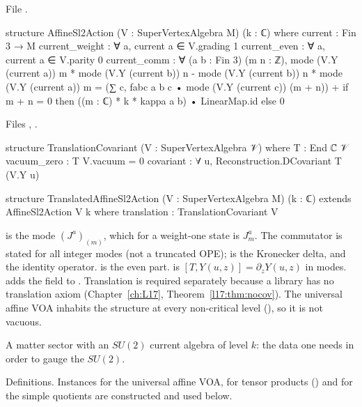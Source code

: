 \noindent File .
\begin{leancode}
structure AffineSl2Action (V : SuperVertexAlgebra M) (k : ℂ) where
  current : Fin 3 → M
  current_weight : ∀ a, current a ∈ V.grading 1
  current_even : ∀ a, current a ∈ V.parity 0
  current_comm : ∀ (a b : Fin 3) (m n : ℤ),
    mode (V.Y (current a)) m * mode (V.Y (current b)) n
      - mode (V.Y (current b)) n * mode (V.Y (current a)) m
      = (∑ c, fabc a b c • mode (V.Y (current c)) (m + n))
        + if m + n = 0 then ((m : ℂ) * k * kappa a b) • LinearMap.id else 0
\end{leancode}
\noindent Files , .
\begin{leancode}
structure TranslationCovariant (V : SuperVertexAlgebra 𝒱) where
  T : End ℂ 𝒱
  vacuum_zero : T V.vacuum = 0
  covariant : ∀ u, Reconstruction.DCovariant T (V.Y u)

structure TranslatedAffineSl2Action (V : SuperVertexAlgebra M) (k : ℂ)
    extends AffineSl2Action V k where
  translation : TranslationCovariant V
\end{leancode}

\begin{dictionary}
 is the mode $(J^a)_{(m)}$, which for a weight-one state is $J^a_m$. The commutator is stated for all
integer modes (not a truncated OPE);  is the Kronecker delta, and  the identity
operator.  is the even part.  is $[T,Y(u,z)]=\partial_zY(u,z)$ in modes.
 adds the field  to . Translation is required separately because a library
 has no translation axiom (Chapter~\ref{ch:L17}, Theorem~\ref{l17:thm:nocov}). The universal affine VOA
inhabits the structure at every non-critical level (), so it is not vacuous.
\end{dictionary}

\begin{physics}
A matter sector with an $SU(2)$ current algebra of level $k$: the data one needs in order to gauge the $SU(2)$.
\end{physics}

\begin{status}
Definitions. Instances for the universal affine VOA, for tensor products () and for the simple
quotients are constructed and used below.
\end{status}

